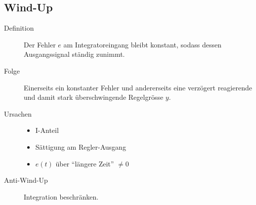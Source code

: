 \subsection{Wind-Up }
\begin{description}
	\item[Definition] Der Fehler \(e\) am Integratoreingang bleibt konstant, sodass dessen Ausgangssignal ständig zunimmt.
	\item[Folge] Einerseits ein konstanter Fehler und andererseits eine verzögert reagierende und damit stark überschwingende Regelgrösse \(y\).

	\item[Ursachen]
		\begin{itemize}
			\item I-Anteil
			\item Sättigung am Regler-Ausgang
			\item \(e(t)\) über ``längere Zeit'' $\neq 0$
		\end{itemize}

	\item[Anti-Wind-Up] Integration beschränken.
\end{description}
